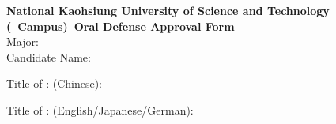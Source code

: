 \begin{titlepage}
  \makeatletter
  \begin{singlespace}
    \begin{center}
        \fontkai
        {\fontsize{18pt}{0pt}\selectfont \textbf{National Kaohsiung University of Science and Technology}}\\[0.5cm]
        {\fontsize{18pt}{0pt}\selectfont \textbf{(\@campusen\ Campus)\@classen \ Oral Defense Approval Form}}\\[1cm]
        
        {\large Major: \uline{\hspace{0.5cm} \makebox[8cm][s]{ {\@instituteen }} \hspace{0.5cm}}\@degreeen} \\[1cm]
        {\large {Candidate Name:\uline{\hspace{2cm}\makebox[2.5cm][s]{\@authoren}\hspace{2cm}} }}\\[1cm]
        
        \begin{flushleft}
                {\large Title of \@classen: (Chinese):\hspace{1em}} \\[0.3cm]
                                            \begin{center}{\large\hspace{1cm} \@titlezh }\end{center}
                {\large Title of \@classen: (English/Japanese/German):}\\[0.3cm]
                                            \begin{center}{\large\hspace{1cm} \@titleen}\end{center}
        \end{flushleft}
  

\end{center}
\end{singlespace}
\end{titlepage}
